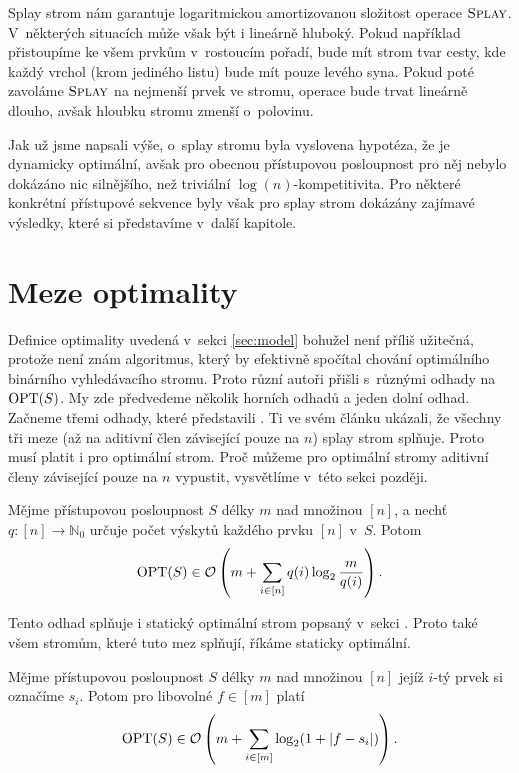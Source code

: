 Splay strom nám garantuje logaritmickou amortizovanou složitost operace
$\ope{Splay}$. V~některých situacích může však být i lineárně hluboký. Pokud
například přistoupíme ke všem prvkům v~rostoucím pořadí, bude mít strom tvar
cesty, kde každý vrchol (krom jediného listu) bude mít pouze levého syna. Pokud
poté zavoláme $\ope{Splay}$ na nejmenší prvek ve stromu, operace bude trvat lineárně
dlouho, avšak hloubku stromu zmenší o~polovinu.

Jak už jsme napsali výše, o~splay stromu byla vyslovena hypotéza, že je
dynamicky optimální, avšak pro obecnou přístupovou posloupnost pro něj nebylo
dokázáno nic silnějšího, než triviální $\log(n)$-kompetitivita. Pro některé
konkrétní přístupové sekvence byly však pro splay strom dokázány zajímavé
výsledky, které si představíme v~další kapitole.

\section{Meze optimality}

Definice optimality uvedená v~sekci \ref{sec:model} bohužel není příliš užitečná, protože není
znám algoritmus, který by efektivně spočítal chování optimálního binárního
vyhledávacího stromu. Proto různí autoři přišli s~různými odhady na $\operatorname{OPT}(S)$.
My zde předvedeme několik horních odhadů a jeden dolní odhad. Začneme třemi
odhady, které představili \citet{splay}. Ti ve svém článku ukázali, že
všechny tři meze (až na aditivní člen závisející pouze na $n$) splay strom
splňuje. Proto musí platit i pro optimální strom. Proč můžeme pro optimální
stromy aditivní členy závisející pouze na $n$ vypustit, vysvětlíme v~této sekci později.

\begin{veta}
Mějme přístupovou posloupnost $S$ délky $m$ nad množinou $[n]$, a nechť $q:[n]\rightarrow \mathbb N_0$ určuje počet výskytů každého prvku $[n]$ v~$S$. Potom $$\opt(S) \in \o\left(m + \sum_{i\in [n]}q(i)\log\frac m{q(i)}\right).$$
\end{veta}

Tento odhad splňuje i statický optimální strom popsaný v~sekci . Proto také všem stromům, které tuto mez splňují, říkáme staticky optimální.  

\begin{veta}
Mějme přístupovou posloupnost $S$ délky $m$ nad množinou $[n]$ jejíž $i$-tý prvek si označíme $s_i$. Potom pro libovolné $f\in [m]$ platí $$\opt(S) \in \o\left(m + \sum_{i\in [m]} \log(1 + |f-s_i|) \right).$$
\end{veta}

